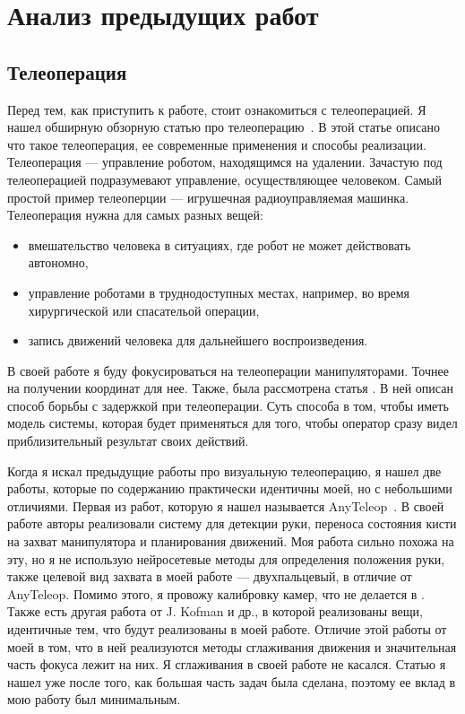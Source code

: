 \documentclass[12pt, a4paper]{article}
\begin{document}
\section{Анализ предыдущих работ}
\subsection{Телеоперация}
  Перед тем, как приступить к работе, стоит ознакомиться с телеоперацией. Я
  нашел обширную обзорную статью про телеоперацию~\cite{teleop-survey}. В этой
  статье описано что такое телеоперация, ее современные применения и способы
  реализации. Телеоперация --- управление роботом, находящимся на удалении.
  Зачастую под телеоперацией подразумевают управление, осуществляющее
  человеком. Самый простой пример телеоперции --- игрушечная радиоуправляемая
  машинка. Телеоперация нужна для самых разных вещей: 
  \begin{itemize}
    \item вмешательство человека в ситуациях, где робот не может действовать автономно,
    \item управление роботами в труднодоступных местах, например, во время хирургической или спасательой операции,
    \item запись движений человека для дальнейшего воспроизведения.
  \end{itemize}
  В своей работе я буду фокусироваться на телеоперации манипуляторами. Точнее
  на получении координат для нее. Также, была рассмотрена статья
  \cite{model-teleop}. В ней описан способ борьбы с задержкой при
  телеоперации. Суть способа в том, чтобы иметь модель системы, которая будет
  применяться для того, чтобы оператор сразу видел приблизительный результат
  своих действий.

  Когда я искал предыдущие работы про визуальную телеоперацию, я нашел две
  работы, которые по содержанию практически идентичны моей, но с небольшими
  отличиями. Первая из работ, которую я нашел называется
  AnyTeleop~\cite{anyteleop}. В своей работе авторы реализовали систему для
  детекции руки, переноса состояния кисти на захват манипулятора и планирования
  движений. Моя работа сильно похожа на эту, но я не использую нейросетевые
  методы для определения положения руки, также целевой вид захвата в моей
  работе --- двухпальцевый, в отличие от AnyTeleop. Помимо этого, я провожу
  калибровку камер, что не делается в \cite{anyteleop}. Также есть другая
  работа от J. Kofman и др.\cite{literally-me}, в которой реализованы вещи,
  идентичные тем, что будут реализованы в моей работе. Отличие этой работы от
  моей в том, что в ней реализуются методы сглаживания движения и значительная
  часть фокуса лежит на них. Я сглаживания в своей работе не касался. 
  Статью \cite{literally-me} я нашел уже после того, как большая часть задач
  была сделана, поэтому ее вклад в мою работу был минимальным.
\end{document}
